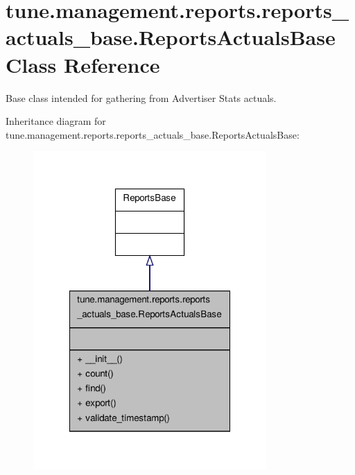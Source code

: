 \hypertarget{classtune_1_1management_1_1reports_1_1reports__actuals__base_1_1ReportsActualsBase}{\section{tune.\-management.\-reports.\-reports\-\_\-actuals\-\_\-base.\-Reports\-Actuals\-Base Class Reference}
\label{classtune_1_1management_1_1reports_1_1reports__actuals__base_1_1ReportsActualsBase}
}


Base class intended for gathering from Advertiser Stats actuals.  




Inheritance diagram for tune.\-management.\-reports.\-reports\-\_\-actuals\-\_\-base.\-Reports\-Actuals\-Base\-:
\nopagebreak
\begin{figure}[H]
\begin{center}
\leavevmode
\includegraphics[width=252pt]{classtune_1_1management_1_1reports_1_1reports__actuals__base_1_1ReportsActualsBase__inherit__graph}
\end{center}
\end{figure}


